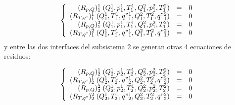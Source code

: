\begin{equation}
\left\{ \begin{array}{rcl}
(R_{p,Q})_{1}^{1}  \;(Q_1^1, p_1^1, T_1^1, Q_1^2, p_1^2, T_1^2) &=& 0 \\
(R_{T,q"})_{1}^{1} \;(Q_1^1, T_1^1, q"_1^1, Q_1^2, T_1^2, q"_1^2) &=& 0 \\
(R_{p,Q})_{1}^{2}  \;(Q_1^1, p_1^1, T_1^1, Q_1^2, p_1^2, T_1^2) &=& 0 \\
(R_{T,q"})_{1}^{2} \;(Q_1^1, T_1^1, q"_1^1, Q_1^2, T_1^2, q"_1^2) &=& 0 
\end{array}
\right.
\label{residuos-1}
\end{equation}
y entre las dos interfaces del subsistema 2 se generan otras 4 ecuaciones de residuos:

\begin{equation}
\left\{ \begin{array}{rcl}
(R_{p,Q})_{2}^{1}  \;(Q_2^1, p_2^1, T_2^1, Q_2^2, p_2^2, T_2^2) &=& 0 \\
(R_{T,q"})_{2}^{1} \;(Q_2^1, T_2^1, q"_2^1, Q_2^2, T_2^2, q"_2^2) &=& 0 \\
(R_{p,Q})_{2}^{2}  \;(Q_2^1, p_2^1, T_2^1, Q_2^2, p_2^2, T_2^2) &=& 0 \\
(R_{T,q"})_{2}^{2} \;(Q_2^1, T_2^1, q"_2^1, Q_2^2, T_2^2, q"_2^2) &=& 0
\end{array}
\right.
\label{residuos-2}
\end{equation}

